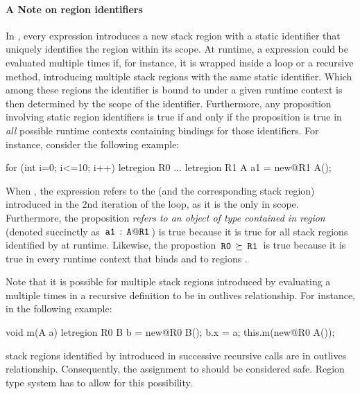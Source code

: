 \paragraph{A Note on region identifiers} In \name, every 
expression introduces a new stack region with a static identifier that
uniquely identifies the region within its scope. At runtime, a
 expression could be evaluated multiple times if, for
instance, it is wrapped inside a  loop or a recursive method,
introducing multiple stack regions with the same static identifier.
Which among these regions the identifier is bound to under a given
runtime context is then determined by the scope of the identifier.
Furthermore, any proposition involving static region identifiers is
true if and only if the proposition is true in \emph{all} possible
runtime contexts containing bindings for those identifiers. For
instance, consider the following example:
\begin{codejava}
for (int i=0; i<=10; i++) {
  letregion R0 {
    ...
    letregion R1 {
      A a1 = new@R1 A();
    }
  }
}
\end{codejava}
When , the  expression refers to the  (and the
corresponding stack region) introduced in the 2nd iteration of the
loop, as it is the only  in scope. Furthermore, the proposition
\emph{ refers to an object of type  contained in region
} (denoted succinctly as $\,{\tt a1}\,:\,{\tt A@R1}\,$) is true because it
is true for all stack regions identified by  at runtime.
Likewise, the propostion $\,{\tt R0}\, \succeq \,{\tt R1}\,$ is true because it
is true in every runtime context that binds  and  to
regions .

Note that it is possible for multiple stack regions introduced by
evaluating a  multiple times in a recursive definition to
be in outlives relationship. For instance, in the following example:
\begin{codejava}
void m(A a) {
  letregion R0 {
    B b = new@R0 B();
    b.x = a;
    this.m(new@R0 A());
  }
}
\end{codejava}
stack regions identified by  introduced in successive recursive
calls are in outlives relationship. Consequently, the assignment to
 should be considered safe. Region type system has to allow for
this possibility.

